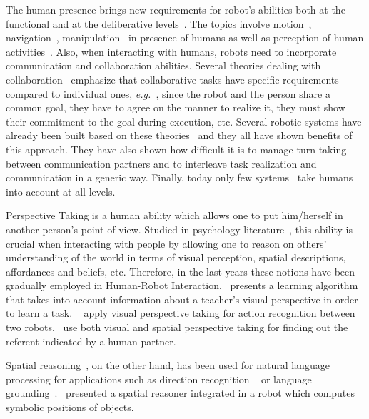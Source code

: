 \documentclass{svmult}
\newcommand{\eg}{{\textit{e.g.~}}}
\begin{document}
The human presence brings new requirements for robot's abilities both
at the functional and at the deliberative levels~\cite{Klein2004}. The
topics involve motion~\cite{Kulic2007,Berg2004,Madhav2006},
navigation~\cite{Althaus2004,Sisbot2007}, manipulation~\cite{Kemp2007}
in presence of humans as well as perception of human
activities~\cite{Breazeal2001,Burger2008}. Also, when
interacting with humans, robots need to incorporate communication and
collaboration abilities. Several theories dealing with
collaboration~\cite{Cohen1991,Grosz1996,Clark1996} emphasize that
collaborative tasks have specific requirements compared to individual
ones, \eg, since the robot and the person share a common goal, they
have to agree on the manner to realize it, they must show their
commitment to the goal during execution, etc. Several robotic systems
have already been built based on these
theories~\cite{Rich1997,Sidner2005,Tambe2005a,Breazeal2003} and they
all have shown benefits of this approach. They have also shown how
difficult it is to manage turn-taking between communication partners
and to interleave task realization and communication in a generic
way. Finally, today only few
systems~\cite{Fong_2006,Breazeal2003,Sisbot2008} take humans into
account at all levels.

Perspective Taking is a human ability which allows one to put
him/herself in another person's point of view. Studied in
psychology literature~\cite{Flavell1992,Tversky1999}, this ability is
crucial when interacting with people by allowing one to reason on
others' understanding of the world in terms of visual perception, spatial
descriptions, affordances and beliefs, etc.
Therefore, in the last years these notions have been gradually
employed in Human-Robot Interaction.~\cite{breazeal2006} presents a
learning algorithm that takes into account information about a
teacher's visual perspective in order to learn a
task. ~\cite{Johnson2005} apply visual perspective taking for action
recognition between two robots.~\cite{Trafton2005} use both visual and
spatial perspective taking for finding out the referent indicated by a
human partner.

Spatial reasoning~\cite{OKeefe1999}, on the other hand, has been used
for natural language processing for applications such as direction
recognition ~\cite{Kollar10,Matuszek10} or language
grounding~\cite{Tellex10}.~\cite{Skubic2004} presented a spatial
reasoner integrated in a robot which computes symbolic positions of
objects.
\end{document}
